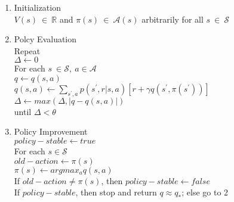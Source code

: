 \documentclass{article}
\begin{document}
\thispagestyle{empty}

\begin{enumerate}
\item Initialization \\
$V(s) \ \in \ \mathbb{R}$ and $\pi(s) \ \in \ \mathcal{A}(s)$ arbitrarily for all $s \ \in \ \mathcal{S} $
\item Polcy Evaluation \\
Repeat \\
$\Delta \leftarrow 0$\\
For each $s \ \in \mathcal{S}, \ a \in \mathcal{A}$\\
$q \leftarrow q(s,a)$ \\
$q(s,a) \leftarrow \sum_{s^\prime,a}p(s^\prime,r|s,a)[r+\gamma q(s^\prime,\pi(s^\prime))]$\\
$\Delta \leftarrow max(\Delta, |q-q(s,a)|)$ \\
until $\Delta < \theta$
\item Policy Improvement\\
$policy\!-\!stable \leftarrow true$\\
For each $s \in \mathcal{S}$\\
$old\!-\!action \leftarrow \pi(s)$\\
$\pi(s) \leftarrow argmax_a q(s,a)$\\
If $old\!-\!action  \not = \pi(s)$, then $policy\!-\!stable \leftarrow false$\\
If $policy\!-\!stable$, then stop and return $q\approx q_*$; else go to 2

\end{enumerate}
\end{document}
